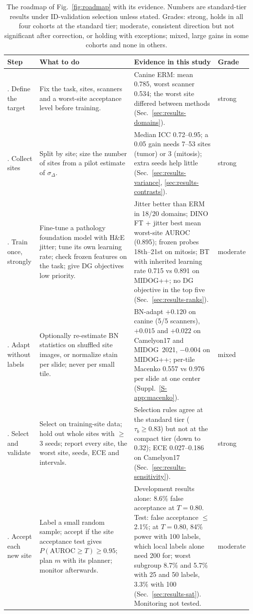\begin{table}[width=\linewidth,pos=tbp]
\caption{The roadmap of Fig.~\ref{fig:roadmap} with its evidence. Numbers are
standard-tier results under ID-validation selection unless stated. Grades:
strong, holds in all four cohorts at the standard tier; moderate, consistent
direction but not significant after correction, or holding with exceptions;
mixed, large gains in some cohorts and none in others.}
\label{tab:roadmap}
\footnotesize
\begin{tabular*}{\tblwidth}{@{\extracolsep{\fill}}>{\raggedright\arraybackslash}p{2.1cm}>{\raggedright\arraybackslash}p{5.2cm}>{\raggedright\arraybackslash}p{6.2cm}l@{}}
\toprule
Step & What to do & Evidence in this study & Grade \\
\midrule
1. Define the target & Fix the task, sites, scanners and a worst-site acceptance level before training. & Canine ERM: mean 0.785, worst scanner 0.534; the worst site differed between methods (Sec.~\ref{sec:results-domains}). & strong \\
2. Collect sites & Split by site; size the number of sites from a pilot estimate of $\sigma_\Delta$. & Median ICC 0.72--0.95; a 0.05 gain needs 7--53 sites (tumor) or 3 (mitosis); extra seeds help little (Sec.~\ref{sec:results-variance}, \ref{sec:results-contrasts}). & strong \\
3. Train once, strongly & Fine-tune a pathology foundation model with H\&E jitter; tune its own learning rate; check frozen features on the task; give DG objectives low priority. & Jitter better than ERM in 18/20 domains; DINO FT + jitter best mean worst-site AUROC (0.895); frozen probes 18th--21st on mitosis; BT with inherited learning rate 0.715 vs 0.891 on MIDOG++; no DG objective in the top five (Sec.~\ref{sec:results-ranks}). & moderate \\
4. Adapt without labels & Optionally re-estimate BN statistics on shuffled site images, or normalize stain per slide; never per small tile. & BN-adapt $+0.120$ on canine (5/5 scanners), $+0.015$ and $+0.022$ on Camelyon17 and MIDOG~2021, $-0.004$ on MIDOG++; per-tile Macenko 0.557 vs 0.976 per slide at one center (Suppl.~\ref{S-app:macenko}). & mixed \\
5. Select and validate & Select on training-site data; hold out whole sites with $\ge$3 seeds; report every site, the worst site, seeds, ECE and intervals. & Selection rules agree at the standard tier ($\tau_b\ge0.83$) but not at the compact tier (down to 0.32); ECE 0.027--0.186 on Camelyon17 (Sec.~\ref{sec:results-sensitivity}). & strong \\
6. Accept each new site & Label a small random sample; accept if the site acceptance test gives $P(\text{AUROC}\ge T)\ge0.95$; plan $m$ with its planner; monitor afterwards. & Development results alone: 8.6\% false acceptance at $T=0.80$. Test: false acceptance $\le$2.1\%; at $T=0.80$, 84\% power with 100 labels, which local labels alone need 200 for; worst subgroup 8.7\% and 5.7\% with 25 and 50 labels, 3.3\% with 100 (Sec.~\ref{sec:results-sat}). Monitoring not tested. & moderate \\
\bottomrule
\end{tabular*}
\end{table}


